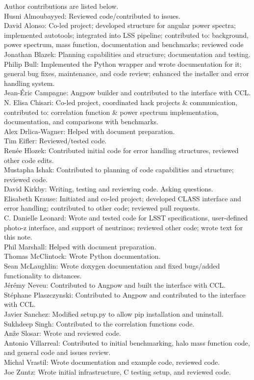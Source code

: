 Author contributions are listed below. \\
Husni Almoubayyed: Reviewed code/contributed to issues. \\
David Alonso: Co-led project; developed structure for angular power spectra; implemented autotools; integrated into LSS pipeline; contributed to: background, power spectrum, mass function, documentation and benchmarks; reviewed code \\
Jonathan Blazek: Planning capabilities and structure; documentation and testing. \\
Philip Bull: Implemented the Python wrapper and wrote documentation for it; general bug fixes, maintenance, and code review; enhanced the installer and error handling system. \\
Jean-\'Eric Campagne: Angpow builder and contributed to the interface with CCL. \\
N. Elisa Chisari: Co-led project, coordinated hack projects \& communication, contributed to: correlation function \& power spectrum implementation, documentation, and comparisons with benchmarks. \\
Alex Drlica-Wagner: Helped with document preparation. \\
Tim Eifler: Reviewed/tested code. \\
Ren\'ee Hlozek: Contributed initial code for error handling structures, reviewed other code edits. \\
Mustapha Ishak: Contributed to planning of code capabilities and structure; reviewed code. \\
David Kirkby: Writing, testing and reviewing code. Asking questions. \\
Elisabeth Krause: Initiated and co-led project; developed CLASS interface and error handling; contributed to other code; reviewed pull requests. \\
C. Danielle Leonard: Wrote and tested code for LSST specifications, user-defined photo-z interface, and support of neutrinos; reviewed other code; wrote text for this note. \\
Phil Marshall: Helped with document preparation. \\
Thomas McClintock: Wrote Python documentation. \\
Sean McLaughlin: Wrote doxygen documentation and fixed bugs/added functionality to distances. \\
J\'er\'emy Neveu: Contributed to Angpow and built the interface with CCL. \\
St\'ephane Plaszczynski: Contributed to Angpow and contributed to the interface with CCL. \\
Javier Sanchez: Modified setup.py to allow pip installation and uninstall. \\
Sukhdeep Singh: Contributed to the correlation functions code. \\
An\v{z}e Slosar: Wrote and reviewed code. \\
Antonio Villarreal: Contributed to initial benchmarking, halo mass function code, and general code and issues review. \\
Michal Vrastil: Wrote documentation and example code, reviewed code. \\
Joe Zuntz: Wrote initial infrastructure, C testing setup, and reviewed code. \\
